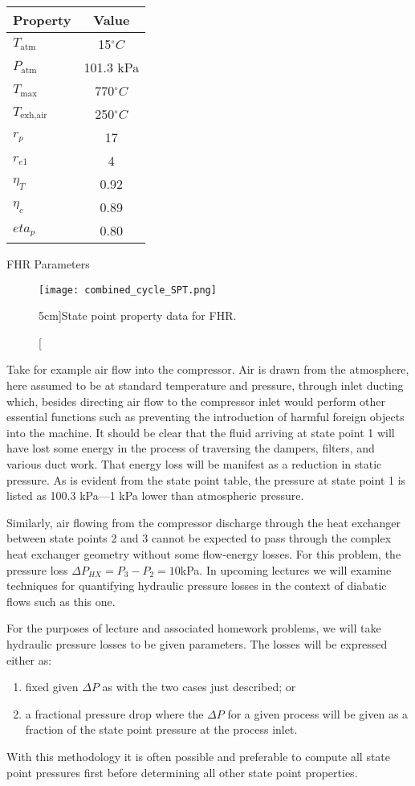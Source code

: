 \begin{margintable}
\begin{tabular}{lc}
\toprule
Property & Value \\
\midrule
$T_{\text{atm}}$ & 15$^{\circ}C$ \\
$P_{\text{atm}}$ & 101.3 kPa \\
$T_{\text{max}}$ & 770$^{\circ}C$ \\
$T_{\text{exh,air}}$ & 250$^{\circ}C$ \\
$r_{p}$ & 17 \\
$r_{e1}$ & 4 \\
$\eta_T$ & 0.92 \\
$\eta_c$ & 0.89 \\
$eta_p$ & 0.80 \\
\bottomrule
\end{tabular}
\caption{FHR Parameters}
\label{tab:FHR_params}
\end{margintable}

\begin{figure}
\texttt{[image: combined\_cycle\_SPT.png]}
\caption[][5cm]{State point property data for FHR.}
\label{fig:combined_cycle_SPT}
\end{figure}

Take for example air flow into the compressor.  Air is drawn from the atmosphere, here assumed to be at standard temperature and pressure, through inlet ducting which, besides directing air flow to the compressor inlet would perform other essential functions such as preventing the introduction of harmful foreign objects into the machine. It should be clear that the fluid arriving at state point 1 will have lost some energy in the process of traversing the dampers, filters, and various duct work. That energy loss will be manifest as a reduction in static pressure.  As is evident from the state point table, the pressure at state point 1 is listed as 100.3 kPa---1 kPa lower than atmospheric pressure.  

Similarly, air flowing from the compressor discharge through the heat exchanger between state points 2 and 3 cannot be expected to pass through the complex heat exchanger geometry without some flow-energy losses.  For this problem, the pressure loss $\Delta P_{HX} = P_3 - P_2 = 10$kPa.  In upcoming lectures we will examine techniques for quantifying hydraulic pressure losses in the context of diabatic flows such as this one.

For the purposes of lecture and associated homework problems, we will take hydraulic pressure losses to be given parameters.  The losses will be expressed either as:
\begin{enumerate}
\item fixed given $\Delta P$ as with the two cases just described; or
\item a fractional pressure drop where the $\Delta P$ for a given process will be given as a fraction of the state point pressure at the process inlet. 
\end{enumerate}
With this methodology it is often possible and preferable to compute all state point pressures first before determining all other state point properties.

